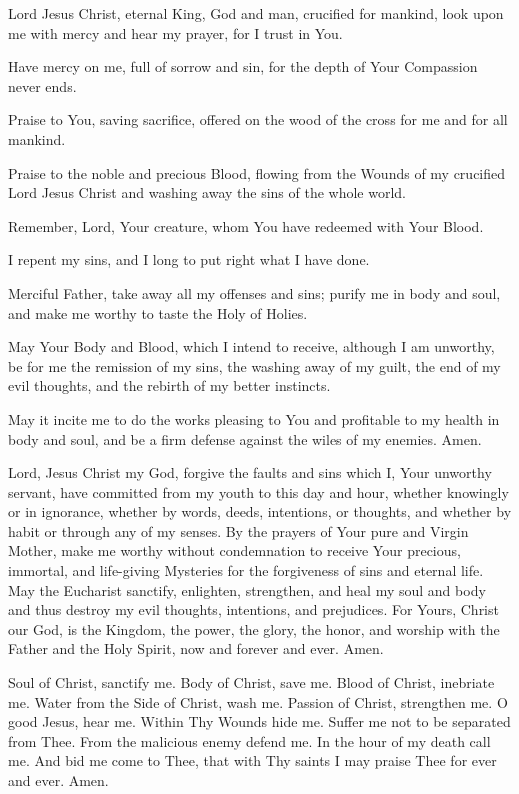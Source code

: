 Lord Jesus Christ, eternal King, God and man, crucified for mankind, look upon me with mercy and hear my prayer, for I trust in You.

Have mercy on me, full of sorrow and sin, for the depth of Your Compassion never ends.

Praise to You, saving sacrifice, offered on the wood of the cross for me and for all mankind.

Praise to the noble and precious Blood, flowing from the Wounds of my crucified Lord Jesus Christ and washing away the sins of the whole world.

Remember, Lord, Your creature, whom You have redeemed with Your Blood.

I repent my sins, and I long to put right what I have done.

Merciful Father, take away all my offenses and sins;
purify me in body and soul, and make me worthy to taste the Holy of Holies.

May Your Body and Blood, which I intend to receive, although I am unworthy, be for me the remission of my sins, the washing away of my guilt, the end of my evil thoughts, and the rebirth of my better instincts.

May it incite me to do the works pleasing to You and profitable to my health in body and soul, and be a firm defense against the wiles of my enemies.
Amen.

Lord, Jesus Christ my God, forgive the faults and sins which I, Your unworthy servant, have committed from my youth to this day and hour, whether knowingly or in ignorance, whether by words, deeds, intentions, or thoughts, and whether by habit or through any of my senses.
By the prayers of Your pure and Virgin Mother, make me worthy without condemnation to receive Your precious, immortal, and life-giving Mysteries for the forgiveness of sins and eternal life.
May the Eucharist sanctify, enlighten, strengthen, and heal my soul and body and thus destroy my evil thoughts, intentions, and prejudices.
For Yours, Christ our God, is the Kingdom, the power, the glory, the honor, and worship with the Father and the Holy Spirit, now and forever and ever.
Amen.

Soul of Christ, sanctify me.
Body of Christ, save me.
Blood of Christ, inebriate me.
Water from the Side of Christ, wash me.
Passion of Christ, strengthen me.
O good Jesus, hear me.
Within Thy Wounds hide me.
Suffer me not to be separated from Thee.
From the malicious enemy defend me.
In the hour of my death call me.
And bid me come to Thee,
that with Thy saints I may praise Thee for ever and ever.
Amen.


